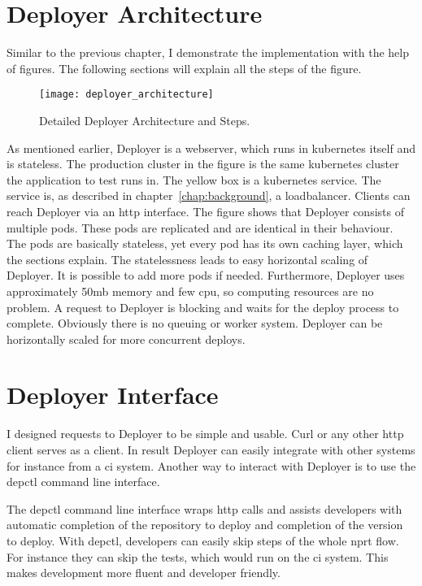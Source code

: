 \section{Deployer Architecture}

Similar to the previous chapter, I demonstrate the implementation with the help of
figures. The following sections will explain all the steps of the figure.

\begin{figure}[htbp]
  \centering
  \texttt{[image: deployer\_architecture]}
  \caption[nprtflow]{Detailed Deployer Architecture and Steps.}
  \label{fig:deployer_architecture}
\end{figure}

As mentioned earlier, Deployer is a webserver, which runs in kubernetes itself and is
stateless. The production cluster in the figure is the same kubernetes cluster the
application to test runs in. The yellow box is a kubernetes service. The service is, as
described in chapter~\ref{chap:background}, a loadbalancer. Clients can reach Deployer via
an http interface. The figure shows that Deployer consists of multiple pods. These pods
are replicated and are identical in their behaviour. The pods are basically stateless, yet
every pod has its own caching layer, which the sections explain. The statelessness leads
to easy horizontal scaling of Deployer. It is possible to add more pods if
needed. Furthermore, Deployer uses approximately 50mb memory and few cpu, so computing
resources are no problem. A request to Deployer is blocking and waits for the deploy
process to complete. Obviously there is no queuing or worker system. Deployer can be
horizontally scaled for more concurrent deploys.


\section{Deployer Interface}
\label{sec:interface}

I designed requests to Deployer to be simple and usable. Curl or any other http client
serves as a client. In result Deployer can easily integrate with other systems for
instance from a \gls{ci} system. Another way to interact with Deployer is to use the
depctl command line interface.

The depctl command line interface wraps http calls and assists developers with automatic
completion of the repository to deploy and completion of the version to deploy. With
depctl, developers can easily skip steps of the whole \gls{nprt} flow. For instance they
can skip the tests, which would run on the \gls{ci} system. This makes development more
fluent and developer friendly.

